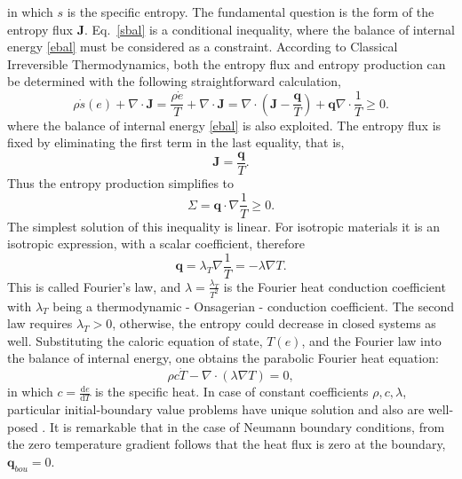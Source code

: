 \documentclass[sn-mathphys]{sn-jnl}%
\theoremstyle{thmstyleone}%
\theoremstyle{thmstyletwo}%
\theoremstyle{thmstylethree}%
\begin{document}
{in which $s$ is the specific entropy. The fundamental question is the form of the entropy flux $\mathbf{J}$. Eq.~\eqref{sbal} is a conditional inequality, where the balance of internal energy \eqref{ebal} must be considered as a constraint. According to Classical Irreversible Thermodynamics, both the entropy flux and entropy production can be determined with the following straightforward calculation,
\begin{equation}
	\rho \dot s(e) + \nabla\cdot \mathbf{J} = \frac{\rho\dot e }{T} + \nabla\cdot \mathbf{J} =
	\nabla\cdot \left(\mathbf{J} - \frac{\mathbf q}{T}\right) + \mathbf{q}\nabla\cdot \frac{1}{T}\geq 0.
\end{equation}
where the balance of internal energy \eqref{ebal} is also exploited.
The entropy flux is fixed by eliminating the first term in the last equality, that is,
$$
\mathbf{J}= \frac{\mathbf q}{T}.
$$
Thus the entropy production simplifies to
$$
\Sigma = \mathbf{q}\cdot\nabla \frac{1}{T}\geq 0.
$$
The simplest solution of this inequality is linear. For isotropic materials it is an isotropic expression, with a scalar coefficient, therefore
\begin{equation}
	\mathbf{q} = \lambda_T \nabla \frac{1}{T} = - \lambda \nabla T.
	\label{Flaw}\end{equation}
This is called Fourier's law, and  $\lambda = \frac{\lambda_T }{T^2}$ is the Fourier heat conduction coefficient with $\lambda_T$ being a thermodynamic - Onsagerian - conduction coefficient. The second law requires $\lambda_T >0$, otherwise, the entropy could decrease in closed systems as well. Substituting the caloric equation of state, $T(e)$, and the Fourier law into the balance of internal energy, one obtains the parabolic Fourier heat equation:
\begin{equation}
	\rho c \dot T - \nabla\cdot (\lambda \nabla T) =0,
	\label{Feq}
\end{equation}
in which $c = \frac{\textrm{d} e}{\textrm{d}T}$ is the specific heat. In case of constant coefficients $\rho, c,\lambda$, { particular initial-boundary value problems have unique solution and also are well-posed \cite{Dib95b}.} 
It is remarkable that in the case of Neumann boundary conditions, from the zero temperature gradient follows that the heat flux is zero at the boundary, $\mathbf{q}_{bou}=0$.

}
\end{document}
